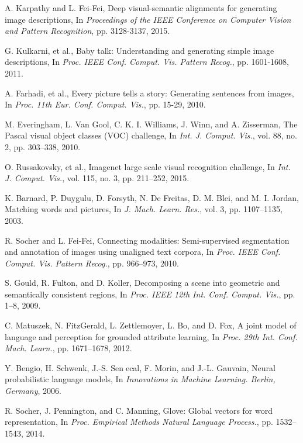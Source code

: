 \documentclass[10pt,twocolumn,letterpaper]{article}
\begin{document}
\begin{thebibliography}{99}
A. Karpathy and L. Fei-Fei, Deep visual-semantic alignments for generating image descriptions,
In \textit{Proceedings of the IEEE Conference on Computer Vision and Pattern Recognition}, pp. 3128-3137, 2015.

G. Kulkarni, et al., Baby talk: Understanding and generating simple image descriptions,
In \textit{Proc. IEEE Conf. Comput. Vis. Pattern Recog.}, pp. 1601-1608, 2011.

A. Farhadi, et al., Every picture tells a story: Generating sentences from images,
In \textit{Proc. 11th Eur. Conf. Comput. Vis.}, pp. 15-29, 2010.

M. Everingham, L. Van Gool, C. K. I. Williams, J. Winn, and A. Zisserman, The Pascal visual object classes (VOC) challenge,
In \textit{Int. J. Comput. Vis.}, vol. 88, no. 2, pp. 303–338, 2010.

O. Russakovsky, et al., Imagenet large scale visual recognition challenge,
In \textit{Int. J. Comput. Vis.}, vol. 115, no. 3, pp. 211–252, 2015.

K. Barnard, P. Duygulu, D. Forsyth, N. De Freitas, D. M. Blei, and M. I. Jordan, Matching words and pictures,
In \textit{J. Mach. Learn. Res.}, vol. 3, pp. 1107–1135, 2003.

R. Socher and L. Fei-Fei, Connecting modalities: Semi-supervised segmentation and annotation of images using unaligned text corpora,
In \textit{Proc. IEEE Conf. Comput. Vis. Pattern Recog.}, pp. 966–973, 2010.

S. Gould, R. Fulton, and D. Koller, Decomposing a scene into geometric and semantically consistent regions,
In \textit{Proc. IEEE 12th Int. Conf. Comput. Vis.}, pp. 1–8, 2009.

C. Matuszek, N. FitzGerald, L. Zettlemoyer, L. Bo, and D. Fox, A joint model of language and perception for grounded attribute learning,
In \textit{Proc. 29th Int. Conf. Mach. Learn.}, pp. 1671–1678, 2012.

Y. Bengio, H. Schwenk, J.-S. Senecal, F. Morin, and J.-L. Gauvain, Neural probabilistic language models,
In \textit{Innovations in Machine Learning. Berlin, Germany}, 2006.

R. Socher, J. Pennington, and C. Manning, Glove: Global vectors for word representation,
In \textit{Proc. Empirical Methods Natural Language Process.}, pp. 1532–1543, 2014.


\end{thebibliography}
\end{document}
